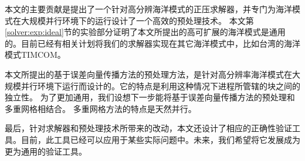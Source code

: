 本文的主要贡献是提出了一个针对高分辨海洋模式的正压求解器，并专门为海洋模式在大规模并行环境下的运行设计了一个高效的预处理技术。
本文第\ref{solver:exp:ideal}节的实验部分证明了本文所提出的高可扩展的海洋模式是通用的。目前已经有相关计划将我们的求解器实现在其它海洋模式中，比如台湾的海洋模式TIMCOM\cite{tseng2011parallel}。 

本文所提出的基于误差向量传播方法的预处理方法，是针对高分辨率海洋模式在大规模并行环境下运行而设计的。它的特点是利用这种情况下进程所管辖的块之间的独立性。 为了更加通用，我们设想下一步能将基于误差向量传播方法的预处理和多重网格相结合。 
多重网格方法的特点是天然并行。 


最后，针对求解器和预处理技术所带来的改动，本文还设计了相应的正确性验证工具。目前，此工具已经可以应用于某些实际问题中。未来，我们希望将它发展成为更为通用的验证工具。 



